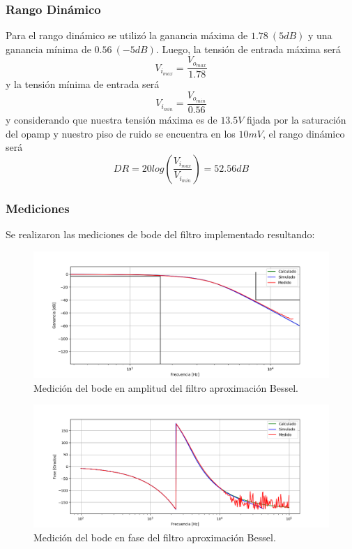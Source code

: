 \subsubsection{Rango Dinámico}

Para el rango dinámico se utilizó la ganancia máxima de $1.78 \ (5dB)$ y una ganancia mínima de $0.56 \ (-5dB)$. Luego, la tensión de entrada máxima será
\begin{equation}
V_{i_{max}}= \frac{V_{o_{max}}}{1.78}
\end{equation}
y la tensión mínima de entrada será
\begin{equation}
V_{i_{min}}= \frac{V_{o_{min}}}{0.56}
\end{equation}
y considerando que nuestra tensión máxima es de $13.5V$ fijada por la saturación del opamp y nuestro piso de ruido se encuentra en los $10mV$, el rango dinámico será
\begin{equation}
DR=20log(\frac{V_{i_{max}}}{V_{i_{min}}}) = 52.56dB
\end{equation}


\subsubsection{Mediciones}

Se realizaron las mediciones de bode del filtro implementado resultando:
\begin{figure}[H]
\centering
	\centering
	\includegraphics[width=\textwidth]{Imagenes-Ej1/bessel_hs_med.png}
	\caption{Medición del bode en amplitud del filtro aproximación Bessel.}
	\label{bes_bodeamp_med}
\end{figure}
\begin{figure}[H]
\centering
	\centering
	\includegraphics[width=\textwidth]{Imagenes-Ej1/bessel_hspha_med.png}
	\caption{Medición del bode en fase del filtro aproximación Bessel.}
	\label{bes_bodepha_med}
\end{figure}

